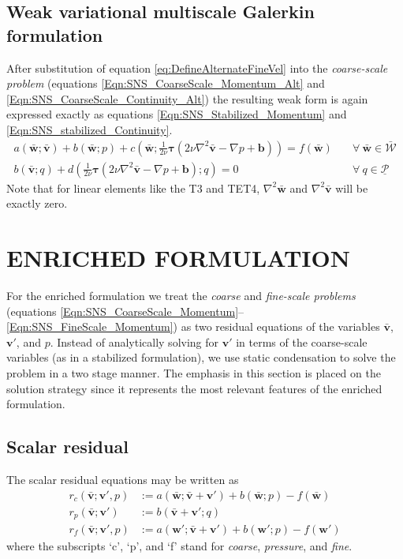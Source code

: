 \documentclass[11pt]{amsart}
\begin{document}
\subsection{Weak variational multiscale Galerkin formulation}
After substitution of equation \eqref{eq:DefineAlternateFineVel} into the \emph{coarse-scale problem} (equations \eqref{Eqn:SNS_CoarseScale_Momentum_Alt} and \eqref{Eqn:SNS_CoarseScale_Continuity_Alt})
the resulting weak form is again expressed exactly as equations \eqref{Eqn:SNS_Stabilized_Momentum} and \eqref{Eqn:SNS_stabilized_Continuity}.
\begin{align}
  \label{Eqn:SNS_New_Stabilized_Momentum}
  a(\bar{\boldsymbol{w}};\bar{\boldsymbol{v}}) + 
  b(\bar{\boldsymbol{w}};p) +
  c(\bar{\boldsymbol{w}} ;\frac{1}{2\nu}\boldsymbol{\tau}(2\nu \nabla^2 \bar{\boldsymbol{v}} - \nabla p + \boldsymbol{b}) ) = 
  f(\bar{\boldsymbol{w}}) & \quad \forall \ \bar{\boldsymbol{w}} \in \bar{\mathcal{W}} \\
\label{Eqn:SNS_New_Stabilized_Continuity}
  b(\bar{\boldsymbol{v}};q) + d(\frac{1}{2\nu}\boldsymbol{\tau}(2\nu \nabla^2 \bar{\boldsymbol{v}} - \nabla p + \boldsymbol{b});q) = 0 & \quad \forall \ q \in \underline{\mathcal{P}}
\end{align}
Note that for linear elements like the T3 and TET4, $\nabla^2 \bar{\boldsymbol{w}}$ and $\nabla^2 \bar{\boldsymbol{v}}$ will be exactly zero.
%
 \section{ENRICHED FORMULATION}
For the enriched formulation we treat the \emph{coarse} and \emph{fine-scale problems} (equations \eqref{Eqn:SNS_CoarseScale_Momentum}-- \eqref{Eqn:SNS_FineScale_Momentum}) as two residual equations of the variables $\bar{\boldsymbol{v}}$, $\boldsymbol{v}'$, and $p$. Instead of analytically solving for $\boldsymbol{v}'$ in terms of the coarse-scale variables (as in a stabilized formulation), we use static condensation to solve the problem in a two stage manner.  The emphasis in this section is placed on the solution strategy since it represents the most relevant features of the enriched formulation.  
\subsection{Scalar residual}
The scalar residual equations may be written as
\begin{align}
  \label{Eqn:SNS_Scalar_Resid_Coarse}
  r_c(\bar{\boldsymbol{v}};\boldsymbol{v}',p) &:= a(\bar{\boldsymbol{w}};\bar{\boldsymbol{v}} + \boldsymbol{v}') + 
  b(\bar{\boldsymbol{w}};p) 
  - f(\bar{\boldsymbol{w}}) \\
  \label{Eqn:SNS_Scalar_Resid_Pressure}
  r_p(\bar{\boldsymbol{v}};\boldsymbol{v}') &:= b(\bar{\boldsymbol{v}} + \boldsymbol{v}';q) \\
  \label{Eqn:SNS_Scalar_Resid_Fine}
  r_f(\bar{\boldsymbol{v}};\boldsymbol{v}',p) &:= a(\boldsymbol{w}';\bar{\boldsymbol{v}} + \boldsymbol{v}') + 
  b(\boldsymbol{w}';p) - f(\boldsymbol{w}')
\end{align}
where the subscripts `c', `p', and `f' stand for \emph{coarse}, \emph{pressure}, and \emph{fine}.
\end{document}

